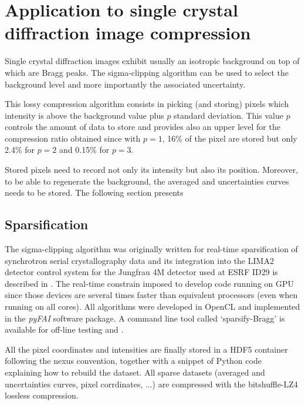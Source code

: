 \documentclass[preprint]{iucr}              %
\begin{document}
\section{Application to single crystal diffraction image compression}
Single crystal diffraction images exhibit usually an isotropic background on top of which are Bragg peaks.
The sigma-clipping algorithm can be used to select the background level and more importantly the associated uncertainty.

This lossy compression algorithm consists in picking (and storing) pixels which intensity is above the background value plus $p$ standard deviation. This value $p$ controls the amount of data to store and provides also an upper level for the compression ratio obtained since with $p=1$, 16\% of the pixel are stored but only 2.4\% for $p=2$ and 0.15\% for $p=3$. 

Stored pixels need to record not only its intensity but also its position. 
Moreover, to be able to regenerate the background, the averaged and uncertainties curves needs to be stored.
The following section presents 

\subsection{Sparsification}

The sigma-clipping algorithm was originally written for real-time sparsification of synchrotron serial crystallography data and its integration into the LIMA2 \cite{lima2} detector control system for the Jungfrau 4M detector used at ESRF ID29 is described in \cite{sri2021}.
The real-time constrain imposed to develop code running on GPU since those devices are several times
faster than equivalent processors (even when running on all cores).
All algorithms were developed in OpenCL \cite{opencl_khronos} and implemented in the \textit{pyFAI} software package.
A command line tool called `sparsify-Bragg' is available for off-line testing and .

All the pixel coordinates and intensities are finally stored in a HDF5 \cite{hdf5} container following the nexus \cite{nexus} convention, together with a snippet of Python code explaining how to rebuild the dataset.
All sparse datasets (averaged and uncertainties curves, pixel corrdinates, ...) are compressed with the bitshuffle-LZ4 \cite{bitshuffle} lossless compression.
\end{document}
